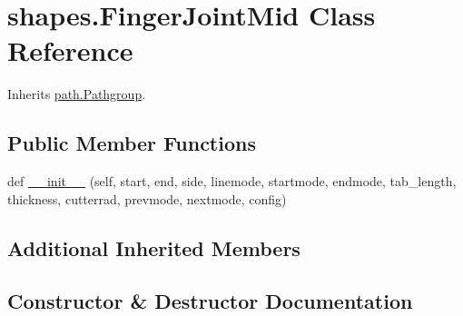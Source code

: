 \hypertarget{classshapes_1_1_finger_joint_mid}{}\section{shapes.\+Finger\+Joint\+Mid Class Reference}
\label{classshapes_1_1_finger_joint_mid}


Inherits \hyperlink{classpath_1_1_pathgroup}{path.\+Pathgroup}.

\subsection*{Public Member Functions}
\begin{DoxyCompactItemize}
\item 
def \hyperlink{classshapes_1_1_finger_joint_mid_a33c93a44febee5037b3e1d3cf98ebd72}{\+\_\+\+\_\+init\+\_\+\+\_\+} (self, start, end, side, linemode, startmode, endmode, tab\+\_\+length, thickness, cutterrad, prevmode, nextmode, config)
\end{DoxyCompactItemize}
\subsection*{Additional Inherited Members}


\subsection{Constructor \& Destructor Documentation}
\hypertarget{classshapes_1_1_finger_joint_mid_a33c93a44febee5037b3e1d3cf98ebd72}{}
